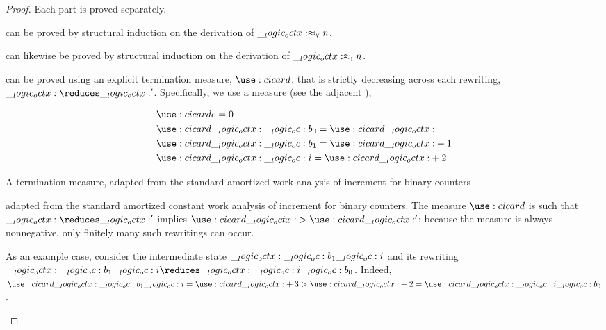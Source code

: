 \begin{proof}
  Each part is proved separately.
  \begin{description}[
    parsep=0pt, listparindent=\parindent,
    labelsep=0.35em
  ]
  \item[Value soundness]
    can be proved by structural induction on the derivation of $\__logic_octx: \approx\sb{\text{\normalfont\scshape v}} n$.
  \item[Preservation and progress]
    can likewise be proved by structural induction on the derivation of $\__logic_octx: \approx\sb{\text{\normalfont\scshape i}} n$.
  \item[Termination]
    can be proved using an explicit termination measure, $\card[i]{}$, that is strictly decreasing across each rewriting, $\octx \reduces \octx'$.
    Specifically, we use a measure (see the adjacent ),
    \begin{marginfigure}
      \begin{equation*}
        \begin{lgathered}
          \card[i]{e} = 0 \\
          \card[i]{\octx \oc b_0} = \card[i]{\octx} \\
          \card[i]{\octx \oc b_1} = \card[i]{\octx} + 1 \\
          \card[i]{\octx \oc i} = \card[i]{\octx} + 2
        \end{lgathered}
      \end{equation*}
      \caption{A termination measure, adapted from the standard amortized work analysis of increment for binary counters}\label{fig:string-rewriting:binary-counter:measure}
    \end{marginfigure}%
    adapted from the standard amortized constant work analysis of increment for binary counters\autocite{??}.
    The measure $\card[i]{}$ is such that $\octx \reduces \octx'$ implies $\card[i]{\octx} > \card[i]{\octx'}$;
    because the measure is always nonnegative, only finitely many such rewritings can occur.

    As an example case, consider the intermediate state $\__logic_octx: \__logic_oc: b_1 \__logic_oc: i$ and its rewriting $\octx \oc b_1 \oc i \reduces \octx \oc i \oc b_0$.
    Indeed, $\card[i]{\octx \oc b_1 \oc i} = \card[i]{\octx} + 3 > \card[i]{\octx} + 2 = \card[i]{\octx \oc i \oc b_0}$.
  \qedhere
  \end{description}
\end{proof}

